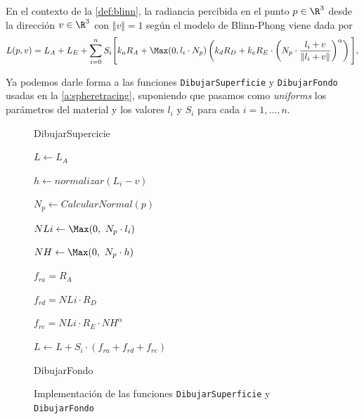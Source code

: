 \begin{definicion}
    En el contexto de la \autoref{def:blinn}, la radiancia percibida en el punto $p\in\R^3$ desde la dirección $v\in\R^3$ con $\Vert v \Vert = 1$ según el modelo de Blinn-Phong viene dada por
    \begin{equation*}
        L(p,v) = L_A+L_E+ \sum_{i=0}^n S_i \Bigg[ k_aR_A + \Max(0,l_i\cdot N_p) \left( k_dR_D + k_eR_E\cdot \left(N_p\cdot \frac{l_i + v}{\Vert l_i + v\Vert} \right)^{\alpha} \right) \Bigg],
    \end{equation*}
\end{definicion}

Ya podemos darle forma a las funciones \texttt{DibujarSuperficie} y \texttt{DibujarFondo} usadas en la \autoref{a:spheretracing}, suponiendo que pasamos como \textit{uniforms} los parámetros del material y los valores $l_i$ y $S_i$ para cada $i=1,\dots, n$.
\begin{figure}[ht!]
    \centering
    
       \begin{algorithm}[H]
            \caption{DibujarSupercicie}
                $L \gets L_A$ 
                 {

                    
                    $h \gets normalizar(L_i - v)$ 
                    
                    $N_p \gets CalcularNormal(p)$
                    
                    $NLi \gets \Max(0,\ N_p\cdot l_i)$
                    
                    $NH \gets \Max(0,\ N_p \cdot h)$\newline

                    $f_{ra} = R_A$
                    
                    $f_{rd} = NLi\cdot R_D$
                    
                    $f_{re} = NLi \cdot R_E \cdot NH^{\alpha}$\newline

                    $L \gets L + S_i\cdot (f_{ra} + f_{rd} + f_{re})$
                }

        \end{algorithm}
    \begin{algorithm}[H]
            \caption{DibujarFondo}
        \end{algorithm}

        \caption{Implementación de las funciones \texttt{DibujarSuperficie} y \texttt{DibujarFondo}}
\end{figure}

